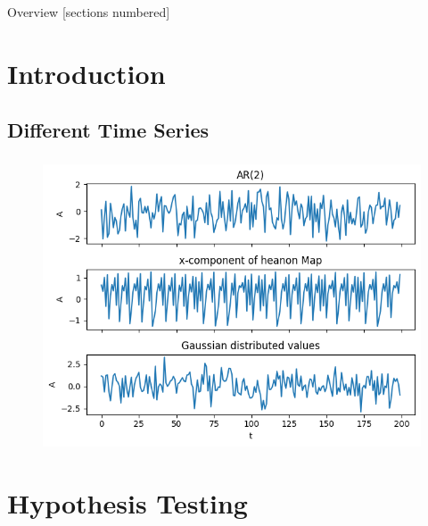 \titleframe

\begin{frame}[shrink=25]{Overview}
  [sections numbered]
  \tableofcontents[hideallsubsections]
\end{frame}

\AtBeginSection{}
\section{Introduction}
\subsection{Different Time Series}
\begin{frame}
    \frametitle{\insertsectionhead}
\framesubtitle{\insertsubsectionhead}
\begin{figure}
    \centering
    \includegraphics[height=0.8\textheight]{figs/time_series.png}
\end{figure}

\end{frame}

\section{Hypothesis Testing}
